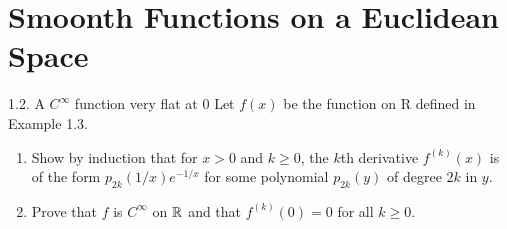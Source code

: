 \section{Smoonth Functions on a Euclidean Space}

\begin{problem}{1.2. A $C^\infty$ function very flat at $0$}
    Let $f(x)$ be the function on R defined in Example 1.3.
\begin{enumerate}[label=(\alph*)]
    \item Show by induction that for $x > 0$ and $k \geq 0$, the $k$th derivative $f^{(k)}(x)$ is of the form
    $p_{2k}(1/x)e^{-1/x}$ for some polynomial $p_{2k}(y)$ of degree $2k$ in $y$.
    \item Prove that $f$ is $C^\infty$ on $\mathbb{R}$ and that $f^{(k)}(0)=0$ for all $k \geq 0$.
\end{enumerate}
\end{problem}

